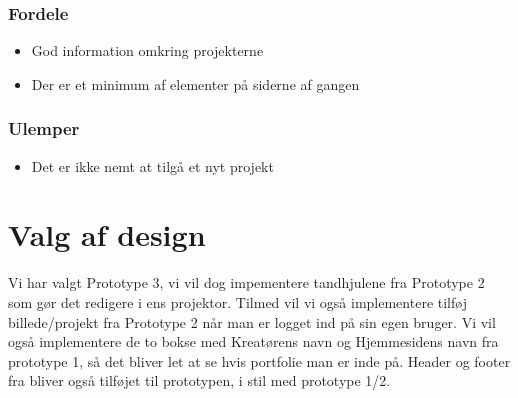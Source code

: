 \documentclass[a4paper,titlepage,fleqn,12pt]{article}
\begin{document}
\subsubsection{Fordele}
\begin{itemize}
\item God information omkring projekterne
\item Der er et minimum af elementer på siderne af gangen
\end{itemize}

\subsubsection{Ulemper}
\begin{itemize}
\item Det er ikke nemt at tilgå et nyt projekt
\end{itemize}

\section{Valg af design}

Vi har valgt Prototype 3, vi vil dog impementere tandhjulene fra Prototype 2 som gør det redigere i ens projektor. Tilmed vil vi også implementere tilføj billede/projekt fra Prototype 2 når man er logget ind på sin egen bruger. Vi vil også implementere de to bokse med Kreatørens navn og Hjemmesidens navn fra prototype 1, så det bliver let at se hvis portfolie man er inde på. Header og footer fra bliver også tilføjet til prototypen, i stil med prototype 1/2.
\end{document}
